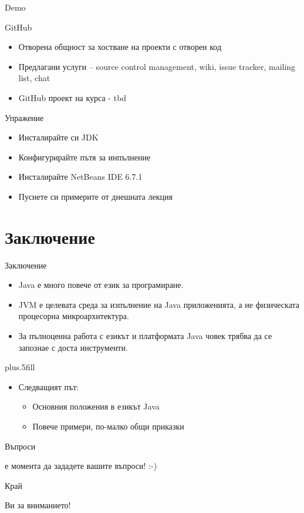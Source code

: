 \documentclass{beamer}
\begin{document}
\begin{frame}{Demo}
  \transdissolve  
\end{frame}

\begin{frame}{GitHub}
  \transdissolve
  \begin{itemize}
    \item Отворена общност за хостване на
    проекти с отворен код
    \item Предлагани услуги – source control
    management, wiki, issue tracker, mailing
    list, chat
    \item GitHub проект на курса - tbd
  \end{itemize}
\end{frame}

\begin{frame}{Упражение}
  \transdissolve  
  \begin{itemize}
    \item Инсталирайте си JDK
    \item Конфигурирайте пътя за инпълнение
    \item Инсталирайте NetBeans IDE 6.7.1
    \item Пуснете си примерите от днешната
    лекция
  \end{itemize}
\end{frame}

\section*{Заключение}

\begin{frame}{Заключение}
  \transdissolve
  \begin{itemize}
  \item
    Java \alert{е много повече от език за програмиране}.
  \item
    JVM \alert{е целевата среда за изпълнение} на Java приложенията, а
    не физическата процесорна микроархитектура.
  \item
    За пълноценна работа с езикът и платформата Java човек трябва да
    се запознае с доста инструменти.
  \end{itemize}
  
  \vskip0pt plus.5fill
  \begin{itemize}
  \item
    Следващият път:
    \begin{itemize}
    \item
      Основния положения в езикът Java
    \item
      Повече примери, по-малко общи приказки
    \end{itemize}
  \end{itemize}
\end{frame}

\begin{frame}{Въпроси}
  \transdissolve
  \begin{center}
     е момента да зададете вашите въпроси! :-)
  \end{center}
\end{frame}

\begin{frame}{Край}
  \transdissolve
  \begin{center}
     Ви за вниманието!
  \end{center}
\end{frame}
\end{document}

